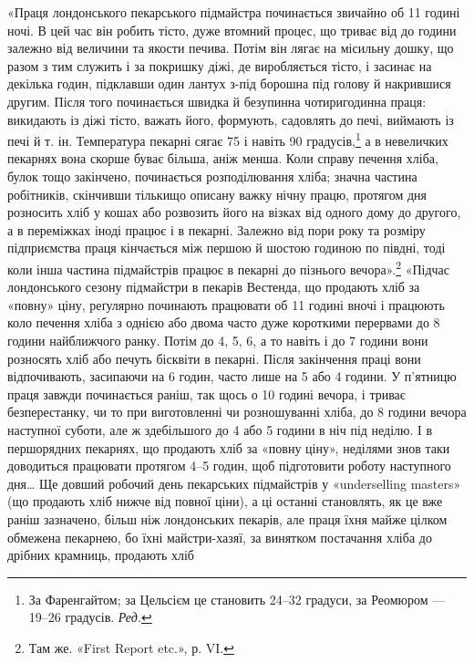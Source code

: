 «Праця лондонського пекарського підмайстра починається
звичайно об 11 годині ночі. В цей час він робить тісто, дуже втомний
процес, що триває від  до  години залежно від величини
та якости печива. Потім він лягає на місильну дошку, що разом
з тим служить і за покришку діжі, де виробляється тісто, і засинає
на декілька годин, підклавши один лантух з-під борошна під
голову й накрившися другим. Після того починається швидка й
безупинна чотиригодинна праця: викидають із діжі тісто, важать
його, формують, садовлять до печі, виймають із печі й т. ін. Температура
пекарні сягає 75 і навіть 90 градусів,\footnote*{
За Фаренгайтом; за Цельсієм це становить 24--32 градуси, за
Реомюром — 19--26 градусів. \emph{Ред.}
} а в невеличких пекарнях
вона скорше буває більша, аніж менша. Коли справу печення
хліба, булок тощо закінчено, починається розподілювання хліба;
значна частина робітників, скінчивши тількищо описану важку
нічну працю, протягом дня розносить хліб у кошах або розвозить
його на візках від одного дому до другого, а в переміжках іноді працює
і в пекарні. Залежно від пори року та розміру підприємства
праця кінчається між першою й шостою годиною по півдні, тоді коли
інша частина підмайстрів працює в пекарні до пізнього вечора».\footnote{
Там же. «First Report etc.», р. VI.
}
«Підчас лондонського сезону підмайстри в пекарів Вестенда, що
продають хліб за «повну» ціну, реґулярно починають працювати
об 11 годині вночі і працюють коло печення хліба з однією або
двома часто дуже короткими перервами до 8 години найближчого
ранку. Потім до 4, 5, 6, а то навіть і до 7 години вони розносять
хліб або печуть бісквіти в пекарні. Після закінчення праці вони
відпочивають, засипаючи на 6 годин, часто лише на 5 або 4 години.
У п’ятницю праця завжди починається раніш, так щось о 10 годині
вечора, і триває безперестанку, чи то при виготовленні чи розношуванні
хліба, до 8 години вечора наступної суботи, але ж здебільшого
до 4 або 5 години в ніч під неділю. І в першорядних
пекарнях, що продають хліб за «повну ціну», неділями знов таки
доводиться працювати протягом 4--5 годин, щоб підготовити
роботу наступного дня\dots{} Ще довший робочий день пекарських
підмайстрів у «underselling masters» (що продають хліб нижче
від повної ціни), а ці останні становлять, як це вже раніш зазначено,
більш ніж  лондонських пекарів, але праця їхня
майже цілком обмежена пекарнею, бо їхні майстри-хазяї, за
винятком постачання хліба до дрібних крамниць, продають хліб
\parbreak{}  %
